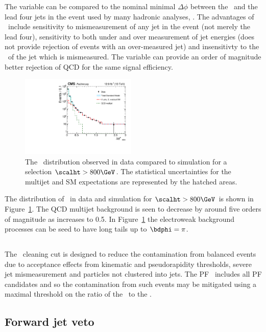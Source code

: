 The \bdphi variable can be compared to the nominal minimal $\Delta \phi$ between
the \mht~and the lead four jets in the event used by many hadronic analyses, \dphimhtj.
The advantages of \bdphi~include sensitivity to mismeasurement of any jet in the 
event (not merely the lead four), sensitivity to both under and over measurement
of jet energies (\dphimhtj does not provide rejection of events with an over-measured jet)
and insensitivty to the \pt~of the jet which is mismeasured. The \bdphi variable
can provide an order of magnitude better rejection of QCD for the same signal efficiency. 

\begin{figure}[!htb]
  \centering
    \includegraphics[width=0.49\textwidth]{./Figures/alphat/bdphi_data.pdf}
  \caption{
    The \bdphi~distribution observed in data compared to simulation for a selection $\scalht > 800\GeV$.
    The statistical uncertainties for the multijet and SM expectations are represented by the hatched areas. 
    }
  \label{fig:bdphi-data}
\end{figure}

The distribution of \bdphi~in data and simulation for $\scalht > 800\GeV$ is shown in Figure~\ref{fig:bdphi-data}.
The QCD multijet background is seen to decrease by around five orders of magnitude as \bdphi increases
to 0.5. In Figure~\ref{fig:bdphi-data} the electroweak background processes
can be seed to have long tails up to $\bdphi = \pi$.


\subsection{\mhtmet}
The \mhtmet~cleaning cut is designed to reduce the contamination from balanced events
due to acceptance effects from kinematic and pseudorapidity thresholds, 
severe jet mismeasurement and particles not clustered into jets. The PF \met~includes
all PF candidates and so the contamination from such events may be mitigated 
using a maximal threshold on the ratio of the \mht~to the \met.
\subsection{Forward jet veto}

